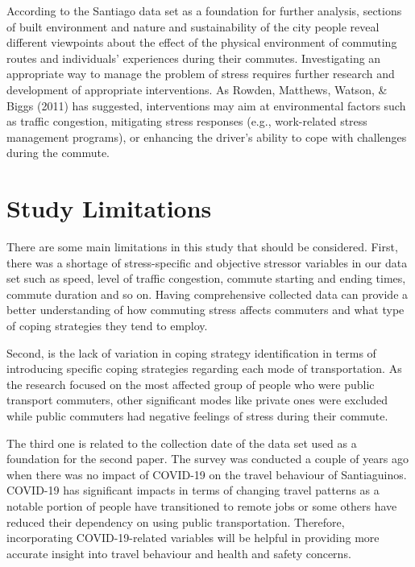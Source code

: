 \documentclass[
11pt, %
oneside, %
english, %
singlespacing, %
]{macthesis} %
\begin{document}
According to the Santiago data set as a foundation for further analysis, sections of built environment and nature and sustainability of the city people reveal different viewpoints about the effect of the physical environment of commuting routes and individuals' experiences during their commutes. Investigating an appropriate way to manage the problem of stress requires further research and development of appropriate interventions. As Rowden, Matthews, Watson, \& Biggs (2011) has suggested, interventions may aim at environmental factors such as traffic congestion, mitigating stress responses (e.g., work-related stress management programs), or enhancing the driver's ability to cope with challenges during the commute.

\hypertarget{study-limitations}{%
\section{Study Limitations}\label{study-limitations}}

There are some main limitations in this study that should be considered. First, there was a shortage of stress-specific and objective stressor variables in our data set such as speed, level of traffic congestion, commute starting and ending times, commute duration and so on. Having comprehensive collected data can provide a better understanding of how commuting stress affects commuters and what type of coping strategies they tend to employ.

Second, is the lack of variation in coping strategy identification in terms of introducing specific coping strategies regarding each mode of transportation. As the research focused on the most affected group of people who were public transport commuters, other significant modes like private ones were excluded while public commuters had negative feelings of stress during their commute.

The third one is related to the collection date of the data set used as a foundation for the second paper. The survey was conducted a couple of years ago when there was no impact of COVID-19 on the travel behaviour of Santiaguinos. COVID-19 has significant impacts in terms of changing travel patterns as a notable portion of people have transitioned to remote jobs or some others have reduced their dependency on using public transportation. Therefore, incorporating COVID-19-related variables will be helpful in providing more accurate insight into travel behaviour and health and safety concerns.
\end{document}
